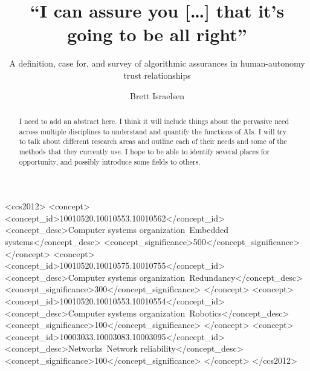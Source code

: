 \documentclass[manuscript, review, screen, authordraft]{acmart}
\begin{document}
\title{``I can assure you [\ldots] that it's going to be all right''} 
 \subtitle{A definition, case for, and survey of algorithmic assurances in human-autonomy trust relationships}
\author{Brett Israelsen}

\begin{abstract}
    I need to add an abstract here. I think it will include things about the pervasive need across multiple disciplines to understand and quantify the functions of AIs. I will try to talk about different research areas and outline each of their needs and some of the methods that they currently  use. I hope to be able to identify several places for opportunity, and possibly introduce some fields to others.
\end{abstract}


%
%
\begin{CCSXML}
<ccs2012>
 <concept>
  <concept_id>10010520.10010553.10010562</concept_id>
  <concept_desc>Computer systems organization~Embedded systems</concept_desc>
  <concept_significance>500</concept_significance>
 </concept>
 <concept>
  <concept_id>10010520.10010575.10010755</concept_id>
  <concept_desc>Computer systems organization~Redundancy</concept_desc>
  <concept_significance>300</concept_significance>
 </concept>
 <concept>
  <concept_id>10010520.10010553.10010554</concept_id>
  <concept_desc>Computer systems organization~Robotics</concept_desc>
  <concept_significance>100</concept_significance>
 </concept>
 <concept>
  <concept_id>10003033.10003083.10003095</concept_id>
  <concept_desc>Networks~Network reliability</concept_desc>
  <concept_significance>100</concept_significance>
 </concept>
</ccs2012>  
\end{CCSXML}

\end{document}
